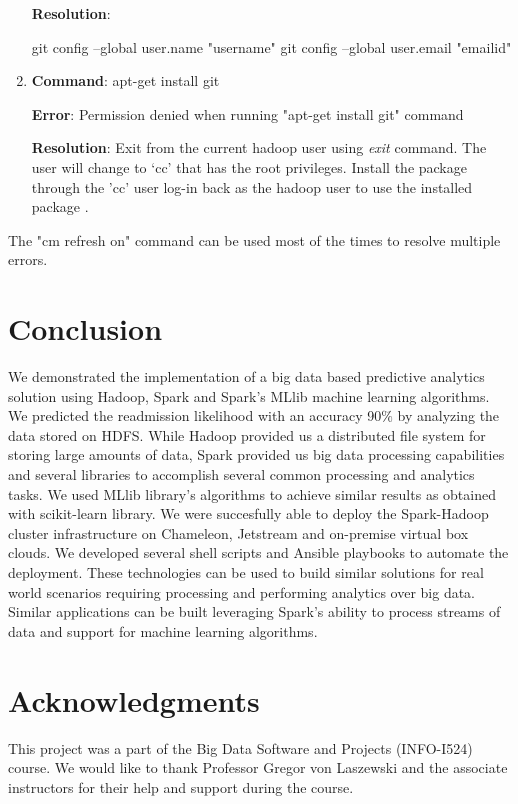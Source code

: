 \documentclass[9pt,twocolumn,twoside]{../../styles/osajnl}
\begin{document}
\begin{enumerate}
 \textbf{Resolution}: 
 
 git config --global user.name "username"
 git config --global user.email "emailid"
 

 \item \textbf{Command}: apt-get install git
 
 \textbf{Error}: Permission denied when running "apt-get install git" command
 
 \textbf{Resolution}: Exit from the current hadoop user using \textit{exit} command. The user will change to ‘cc’ that has the root privileges. Install  the package through the 'cc' user log-in back as the hadoop user to use the installed package .
\end{enumerate}

The "cm refresh on" command can be used most of the times to resolve multiple errors.









    
    

\section{Conclusion}
We demonstrated the implementation of a big data based  predictive analytics solution using Hadoop, Spark and Spark’s MLlib machine learning algorithms. We predicted the readmission likelihood with an accuracy 90$\%$ by analyzing the data stored on HDFS.  While Hadoop provided us a distributed file system for storing large amounts of data, Spark provided us big data processing capabilities and several libraries to accomplish several common processing and analytics tasks. We used MLlib library’s algorithms to achieve similar results as obtained with scikit-learn library. We were succesfully able to deploy the Spark-Hadoop cluster infrastructure on Chameleon, Jetstream and on-premise virtual box clouds. We developed several shell scripts and Ansible playbooks to automate the deployment.  These technologies can be used to build similar solutions for real world scenarios requiring processing and performing analytics over big data.  Similar applications can be built leveraging   Spark’s ability to process streams of data and support for machine learning algorithms. 

\section{Acknowledgments}
This project was a part of the Big Data Software and Projects (INFO-I524) course. We would like to thank Professor Gregor von Laszewski and the associate instructors for their help and support during the course. 


\end{document}
